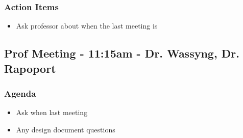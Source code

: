 		\subsubsection*{Action Items}
			\begin{itemize}
				\item Ask professor about when the last meeting is
			\end{itemize}

	\subsection*{Prof Meeting - 11:15am - Dr. Wassyng, Dr. Rapoport}
		\subsubsection*{Agenda}
			\begin{itemize}
				\item Ask when last meeting
				\item Any design document questions
			\end{itemize}

